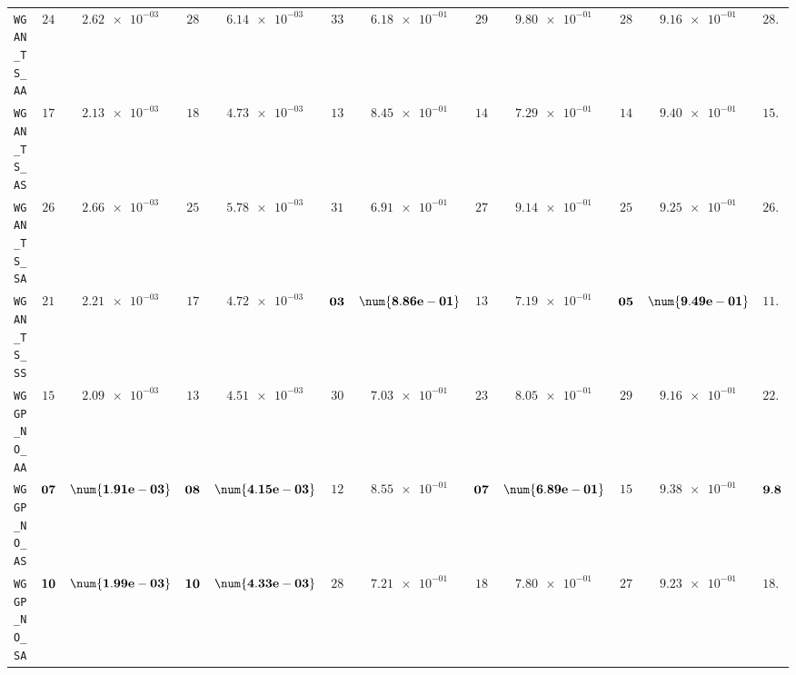 \begin{xltabular}{\textwidth}{l||cC|cC|cC|cC|cC||c}
	\texttt{WGAN\_TS\_AA} & $ 24$ & $ \num{2.62e-03}$ & $ 28$ & $ \num{6.14e-03}$ & $ 33$ & $ \num{6.18e-01}$ & $ 29$ & $ \num{9.80e-01}$ & $ 28$ & $ \num{9.16e-01}$ & $ 28.4$  \\
	\texttt{WGAN\_TS\_AS} & $ 17$ & $ \num{2.13e-03}$ & $ 18$ & $ \num{4.73e-03}$ & $ 13$ & $ \num{8.45e-01}$ & $ 14$ & $ \num{7.29e-01}$ & $ 14$ & $ \num{9.40e-01}$ & $ 15.2$  \\
	\texttt{WGAN\_TS\_SA} & $ 26$ & $ \num{2.66e-03}$ & $ 25$ & $ \num{5.78e-03}$ & $ 31$ & $ \num{6.91e-01}$ & $ 27$ & $ \num{9.14e-01}$ & $ 25$ & $ \num{9.25e-01}$ & $ 26.8$  \\
	\texttt{WGAN\_TS\_SS} & $ 21$ & $ \num{2.21e-03}$ & $ 17$ & $ \num{4.72e-03}$ & $\bf 03$ & $\bf \num{8.86e-01}$ & $ 13$ & $ \num{7.19e-01}$ & $\bf 05$ & $\bf \num{9.49e-01}$ & $ 11.8$  \\ \hline
	\texttt{WGGP\_NO\_AA} & $ 15$ & $ \num{2.09e-03}$ & $ 13$ & $ \num{4.51e-03}$ & $ 30$ & $ \num{7.03e-01}$ & $ 23$ & $ \num{8.05e-01}$ & $ 29$ & $ \num{9.16e-01}$ & $ 22.0$  \\
	\texttt{WGGP\_NO\_AS} & $\bf 07$ & $\bf \num{1.91e-03}$ & $\bf 08$ & $\bf \num{4.15e-03}$ & $ 12$ & $ \num{8.55e-01}$ & $\bf 07$ & $\bf \num{6.89e-01}$ & $ 15$ & $ \num{9.38e-01}$ & $\bf 9.8$  \\
	\texttt{WGGP\_NO\_SA} & $\bf 10$ & $\bf \num{1.99e-03}$ & $\bf 10$ & $\bf \num{4.33e-03}$ & $ 28$ & $ \num{7.21e-01}$ & $ 18$ & $ \num{7.80e-01}$ & $ 27$ & $ \num{9.23e-01}$ & $ 18.6$  \\

\end{xltabular}
